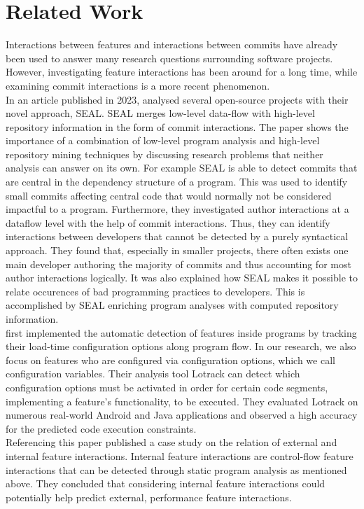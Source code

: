 \chapter{Related Work}\label{ch:related_work}

Interactions between features \cite{lillack2014tracking,kolesnikov2017relation} and interactions between commits \cite{sattler2023seal} have already been used to answer many research questions surrounding software projects.
However, investigating feature interactions has been around for a long time, while examining commit interactions is a more recent phenomenon. \\
In an article published in 2023, \citet{sattler2023seal} analysed several open-source projects with their novel approach, SEAL.
SEAL merges low-level data-flow with high-level repository information in the form of commit interactions.
The paper shows the importance of a combination of low-level program analysis and high-level repository mining techniques by discussing research problems that neither analysis can answer on its own.
For example SEAL is able to detect commits that are central in the dependency structure of a program\cite{sattler2023seal}.
This was used to identify small commits affecting central code that would normally not be considered impactful to a program.
Furthermore, they investigated author interactions at a dataflow level with the help of commit interactions.
Thus, they can identify interactions between developers that cannot be detected by a purely syntactical approach.
They found that, especially in smaller projects, there often exists one main developer authoring the majority of commits\cite{sattler2023seal} and thus accounting for most author interactions logically. 
It was also explained how SEAL makes it possible to relate occurences of bad programming practices to developers. 
This is accomplished by SEAL enriching program analyses with computed repository information. \\
\citet{lillack2014tracking} first implemented the automatic detection of features inside programs by tracking their load-time configuration options along program flow.
In our research, we also focus on features who are configured via configuration options, which we call configuration variables. 
Their analysis tool Lotrack can detect which configuration options must be activated in order for certain code segments, implementing a feature's functionality, to be executed.
They evaluated Lotrack on numerous real-world Android and Java applications and observed a high accuracy for the predicted code execution constraints\cite{lillack2014tracking}. \\
Referencing this paper \citet{kolesnikov2017relation} published a case study on the relation of external and internal feature interactions.
Internal feature interactions are control-flow feature interactions that can be detected through static program analysis as mentioned above.
They concluded that considering internal feature interactions could potentially help predict external, performance feature interactions\cite{kolesnikov2017relation}.
